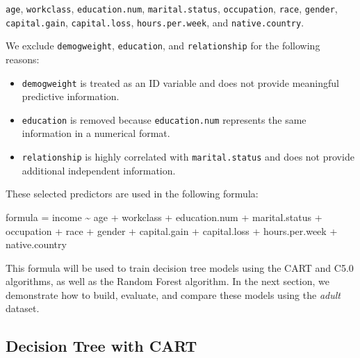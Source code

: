 \documentclass[
  11pt,
]{book}
\makeatletter
\newenvironment{Shaded}{}{}
\newcommand{\NormalTok}[1]{#1}
\newcommand{\OtherTok}[1]{\textcolor[rgb]{0.39,0.39,0.39}{#1}}
\newcommand{\SpecialCharTok}[1]{\textcolor[rgb]{0.39,0.39,0.39}{#1}}
\providecommand{\tightlist}{%
  \setlength{\itemsep}{0pt}\setlength{\parskip}{0pt}}
\newenvironment{kframe}{%
\medskip{}
\setlength{\fboxsep}{.8em}
 \def\at@end@of@kframe{}%
 \ifinner\ifhmode%
  \def\at@end@of@kframe{\end{minipage}}%
  \begin{minipage}{\columnwidth}%
 \fi\fi%
 \def\FrameCommand##1{\hskip\@totalleftmargin \hskip-\fboxsep
 \colorbox{shadecolor}{##1}\hskip-\fboxsep
     \hskip-\linewidth \hskip-\@totalleftmargin \hskip\columnwidth}%
 \MakeFramed {\advance\hsize-\width
   \@totalleftmargin\z@ \linewidth\hsize
   \@setminipage}}%
 {\par\unskip\endMakeFramed%
 \at@end@of@kframe}
\renewenvironment{Shaded}{\begin{kframe}}{\end{kframe}}
\theoremstyle{definition}
\theoremstyle{definition}
\theoremstyle{definition}
\theoremstyle{definition}
\theoremstyle{remark}
\makeatother
\begin{document}
\texttt{age}, \texttt{workclass}, \texttt{education.num}, \texttt{marital.status}, \texttt{occupation}, \texttt{race}, \texttt{gender}, \texttt{capital.gain}, \texttt{capital.loss}, \texttt{hours.per.week}, and \texttt{native.country}.

We exclude \texttt{demogweight}, \texttt{education}, and \texttt{relationship} for the following reasons:

\begin{itemize}
\tightlist
\item
  \texttt{demogweight} is treated as an ID variable and does not provide meaningful predictive information.\\
\item
  \texttt{education} is removed because \texttt{education.num} represents the same information in a numerical format.\\
\item
  \texttt{relationship} is highly correlated with \texttt{marital.status} and does not provide additional independent information.
\end{itemize}

These selected predictors are used in the following formula:

\begin{Shaded}
\begin{Highlighting}[]
\NormalTok{formula }\OtherTok{=}\NormalTok{ income }\SpecialCharTok{\textasciitilde{}}\NormalTok{ age }\SpecialCharTok{+}\NormalTok{ workclass }\SpecialCharTok{+}\NormalTok{ education.num }\SpecialCharTok{+}\NormalTok{ marital.status }\SpecialCharTok{+}\NormalTok{ occupation }\SpecialCharTok{+}\NormalTok{ race }\SpecialCharTok{+}\NormalTok{ gender }\SpecialCharTok{+}\NormalTok{ capital.gain }\SpecialCharTok{+}\NormalTok{ capital.loss }\SpecialCharTok{+}\NormalTok{ hours.per.week }\SpecialCharTok{+}\NormalTok{ native.country}
\end{Highlighting}
\end{Shaded}

This formula will be used to train decision tree models using the CART and C5.0 algorithms, as well as the Random Forest algorithm. In the next section, we demonstrate how to build, evaluate, and compare these models using the \emph{adult} dataset.

\subsection*{Decision Tree with CART}\label{decision-tree-with-cart}
\end{document}

